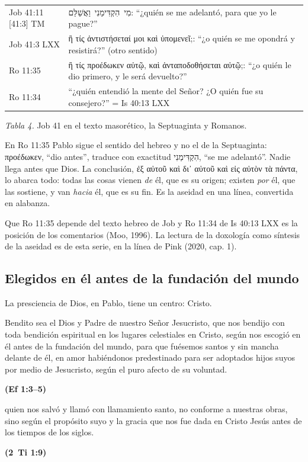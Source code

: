 \documentclass[11pt,letterpaper]{article}
\newcommand{\heb}[1]{\mbox{\foreignlanguage{hebrew}{#1}}}
\newcommand{\grc}[1]{\foreignlanguage{ancientgreek}{#1}}
\newcommand{\fuente}[1]{\par\hfill{\upshape\bfseries\small\textcolor{azul}{#1}}}
\begin{document}
\begin{center}\small\renewcommand{\arraystretch}{1.2}
\begin{tabular}{@{}L{2.6cm}L{11.8cm}@{}}
\toprule
Job 41:11 [41:3] TM & \heb{מִי הִקְדִּימַנִי וַאֲשַׁלֵּם}: ``¿quién se me adelantó, para que yo le pague?'' \\
Job 41:3 LXX & \grc{ἢ τίς ἀντιστήσεταί μοι καὶ ὑπομενεῖ;}: ``¿o quién se me opondrá y resistirá?'' (otro sentido) \\
Ro 11:35 & \grc{ἢ τίς προέδωκεν αὐτῷ, καὶ ἀνταποδοθήσεται αὐτῷ;}: ``¿o quién le dio primero, y le será devuelto?'' \\
Ro 11:34 & ``¿quién entendió la mente del Señor? ¿O quién fue su consejero?'' = Is 40:13 LXX \\
\bottomrule
\end{tabular}\par
{\footnotesize\color{gris}\textit{Tabla 4.} Job 41 en el texto masorético, la Septuaginta y Romanos.}
\end{center}

En Ro 11:35 Pablo sigue el sentido del hebreo y no el de la Septuaginta: \grc{προέδωκεν}, ``dio antes'', traduce con exactitud \heb{הִקְדִּימַנִי}, ``se me adelantó''. Nadie llega antes que Dios. La conclusión, \grc{ἐξ αὐτοῦ καὶ δι᾽ αὐτοῦ καὶ εἰς αὐτὸν τὰ πάντα}, lo abarca todo: todas las cosas vienen \emph{de} él, que es su origen; existen \emph{por} él, que las sostiene, y van \emph{hacia} él, que es su fin. Es la aseidad en una línea, convertida en alabanza.

\begin{nota}[Precisión]
Que Ro 11:35 depende del texto hebreo de Job y Ro 11:34 de Is 40:13 LXX es la posición de los comentarios (Moo, 1996). La lectura de la doxología como síntesis de la aseidad es de esta serie, en la línea de Pink (2020, cap. 1).
\end{nota}

\subsection{Elegidos en él antes de la fundación del mundo}
La presciencia de Dios, en Pablo, tiene un centro: Cristo.

\begin{cita}Bendito sea el Dios y Padre de nuestro Señor Jesucristo, que nos bendijo con toda bendición espiritual en los lugares celestiales en Cristo, según nos escogió en él antes de la fundación del mundo, para que fuésemos santos y sin mancha delante de él, en amor habiéndonos predestinado para ser adoptados hijos suyos por medio de Jesucristo, según el puro afecto de su voluntad.\fuente{(Ef 1:3--5)}\end{cita}
\begin{cita}quien nos salvó y llamó con llamamiento santo, no conforme a nuestras obras, sino según el propósito suyo y la gracia que nos fue dada en Cristo Jesús antes de los tiempos de los siglos.\fuente{(2~Ti 1:9)}\end{cita}
\end{document}
